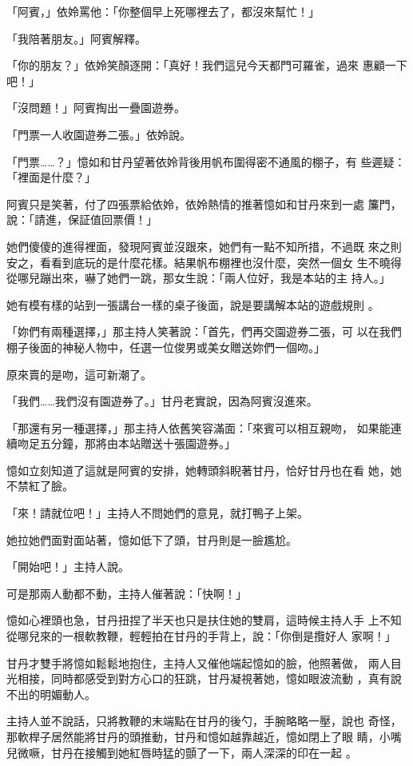 「阿賓，」依姈罵他：「你整個早上死哪裡去了，都沒來幫忙！」

「我陪著朋友。」阿賓解釋。

「你的朋友？」依姈笑顏逐開：「真好！我們這兒今天都門可羅雀，過來
惠顧一下吧！」

「沒問題！」阿賓掏出一疊園遊券。

「門票一人收園遊券二張。」依姈說。

「門票……？」憶如和甘丹望著依姈背後用帆布圍得密不通風的棚子，有
些遲疑：「裡面是什麼？」

阿賓只是笑著，付了四張票給依姈，依姈熱情的推著憶如和甘丹來到一處
簾門，說：「請進，保証值回票價！」

她們傻傻的進得裡面，發現阿賓並沒跟來，她們有一點不知所措，不過既
來之則安之，看看到底玩的是什麼花樣。結果帆布棚裡也沒什麼，突然一個女
生不曉得從哪兒蹦出來，嚇了她們一跳，那女生說：「兩人位好，我是本站的主
持人。」

她有模有樣的站到一張講台一樣的桌子後面，說是要講解本站的遊戲規則
。

「妳們有兩種選擇，」那主持人笑著說：「首先，們再交園遊券二張，可
以在我們棚子後面的神秘人物中，任選一位俊男或美女贈送妳們一個吻。」

原來賣的是吻，這可新潮了。

「我們……我們沒有園遊券了。」甘丹老實說，因為阿賓沒進來。

「那還有另一種選擇，」那主持人依舊笑容滿面：「來賓可以相互親吻，
如果能連續吻足五分鐘，那將由本站贈送十張園遊券。」

憶如立刻知道了這就是阿賓的安排，她轉頭斜睨著甘丹，恰好甘丹也在看
她，她不禁紅了臉。

「來！請就位吧！」主持人不問她們的意見，就打鴨子上架。

她拉她們面對面站著，憶如低下了頭，甘丹則是一臉尷尬。

「開始吧！」主持人說。

可是那兩人動都不動，主持人催著說：「快啊！」

憶如心裡頭也急，甘丹扭捏了半天也只是扶住她的雙肩，這時候主持人手
上不知從哪兒來的一根軟教鞭，輕輕拍在甘丹的手背上，說：「你倒是攬好人
家啊！」

甘丹才雙手將憶如鬆鬆地抱住，主持人又催他端起憶如的臉，他照著做，
兩人目光相接，同時都感受到對方心口的狂跳，甘丹凝視著她，憶如眼波流動
，真有說不出的明媚動人。

主持人並不說話，只將教鞭的末端點在甘丹的後勺，手腕略略一壓，說也
奇怪，那軟桿子居然能將甘丹的頭推動，甘丹和憶如越靠越近，憶如閉上了眼
睛，小嘴兒微噘，甘丹在接觸到她紅唇時猛的顫了一下，兩人深深的印在一起
。

